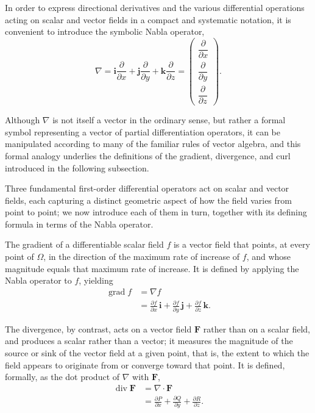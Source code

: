 In order to express directional derivatives and the various differential operations acting on scalar and vector fields in a compact and systematic notation, it is convenient to introduce the symbolic Nabla operator,
\[
\nabla = \mathbf{i} \frac{\partial}{\partial x} + \mathbf{j} \frac{\partial}{\partial y} + \mathbf{k} \frac{\partial}{\partial z} = \begin{pmatrix} \dfrac{\partial}{\partial x} \\[2mm] \dfrac{\partial}{\partial y} \\[2mm] \dfrac{\partial}{\partial z} \end{pmatrix}.
\]

Although $\nabla$ is not itself a vector in the ordinary sense, but rather a formal symbol representing a vector of partial differentiation operators, it can be manipulated according to many of the familiar rules of vector algebra, and this formal analogy underlies the definitions of the gradient, divergence, and curl introduced in the following subsection.


Three fundamental first-order differential operators act on scalar and vector fields, each capturing a distinct geometric aspect of how the field varies from point to point; we now introduce each of them in turn, together with its defining formula in terms of the Nabla operator.

The gradient of a differentiable scalar field $f$ is a vector field that points, at every point of $\Omega$, in the direction of the maximum rate of increase of $f$, and whose magnitude equals that maximum rate of increase. It is defined by applying the Nabla operator to $f$, yielding
\[
\begin{aligned}
\operatorname{grad} f &= \nabla f \\[0.5em]
&= \frac{\partial f}{\partial x} \, \mathbf{i} + \frac{\partial f}{\partial y} \, \mathbf{j} + \frac{\partial f}{\partial z} \, \mathbf{k}.
\end{aligned}
\]

The divergence, by contrast, acts on a vector field $\mathbf{F}$ rather than on a scalar field, and produces a scalar rather than a vector; it measures the magnitude of the source or sink of the vector field at a given point, that is, the extent to which the field appears to originate from or converge toward that point. It is defined, formally, as the dot product of $\nabla$ with $\mathbf{F}$,
\[
\begin{aligned}
\operatorname{div} \mathbf{F} &= \nabla \cdot \mathbf{F} \\[0.5em]
&= \frac{\partial P}{\partial x} + \frac{\partial Q}{\partial y} + \frac{\partial R}{\partial z}.
\end{aligned}
\]

